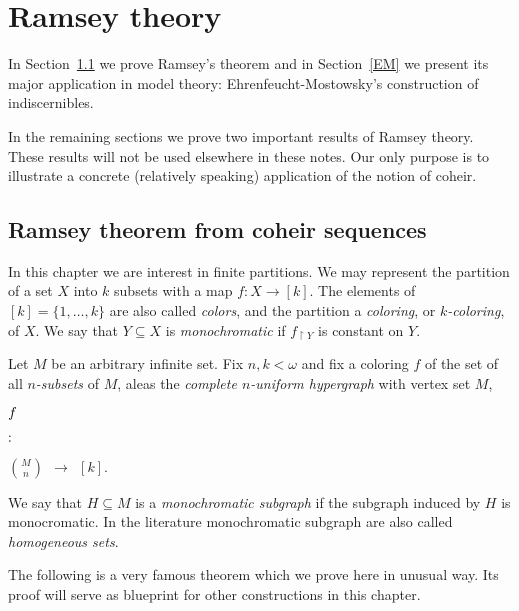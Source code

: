 \documentclass[creche.tex]{subfiles}
\begin{document}
\chapter{Ramsey theory}
\label{ramsey}

In Section~\ref{Ramsey} we prove Ramsey's theorem and in Section~\ref{EM} we present its major application in model theory: 
Ehrenfeucht-Mostowsky's construction of indiscernibles.

In the remaining sections we prove two important results of Ramsey theory.
These results will not be used elsewhere in these notes.
Our only purpose is to illustrate a concrete (relatively speaking) application of the notion of coheir.

\def\medrel#1{\parbox[t]{6ex}{$\displaystyle\hfil #1$}}
\def\ceq#1#2#3{\parbox[t]{12ex}{$\displaystyle #1$}\medrel{#2}{$\displaystyle #3$}}



\section{Ramsey theorem from coheir sequences}
\label{Ramsey}

In this chapter we are interest in finite partitions.
We may represent the partition of a set $X$ into $k$ subsets with a map $f:X\to [k]$.
The elements of $[k]=\{1,\dots,k\}$ are also called \emph{colors},
and the partition a \emph{coloring},
or \emph{$k$-coloring}, of $X$.
We say that $Y\subseteq X$ is \emph{monochromatic\/} if $f_{\restriction Y}$ is constant on $Y$.

Let $M$ be an arbitrary infinite set.
Fix $n,k<\omega$ and fix a coloring $f$ of the set of all \emph{$n$-subsets} of $M$,
aleas the \emph{complete $n$-uniform hypergraph\/} with vertex set $M$,

\ceq{\hfill f}{:}{ {M\choose n}\ \ \to\ \ [k]}.

We say that $H\subseteq M$ is a \emph{monochromatic subgraph\/} if the subgraph induced by $H$ is monocromatic.
In the literature monochromatic subgraph are also called \emph{homogeneous sets}.

The following is a very famous theorem which we prove here in unusual way.
Its proof will serve as blueprint for other constructions in this chapter.
\end{document}
